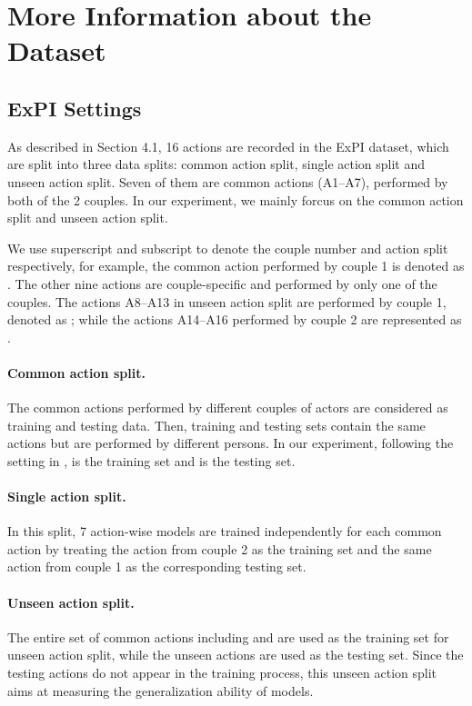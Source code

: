 \documentclass[10pt,twocolumn,letterpaper]{article}
\begin{document}
\section{More Information about the Dataset}
\label{app_sec:dataset}
\subsection{ExPI Settings}
As described in Section 4.1, 16 actions are recorded in the ExPI dataset, which are split into three data splits: common action split, single action split and unseen action split.
Seven of them are common actions (A1--A7), performed by both of the 2 couples. 
In our experiment, we mainly forcus on the common action split and unseen action split. 

We use superscript and subscript to denote the couple number and action split respectively, for example, the common action performed by couple 1 is denoted as .
The other nine actions are couple-specific and performed by only one of the couples.
The actions A8--A13 in unseen action split are performed by couple 1, denoted as ; while the actions A14--A16 performed by couple 2 are represented as . 

\paragraph{Common action split.}
The common actions performed by different couples of actors are considered as training and testing data.
Then, training and testing sets contain the same actions but are performed by different persons.
In our experiment, following the setting in \cite{guo2021multi},  is the training set and  is the testing set.

\paragraph{Single action split.}
In this split, 7 action-wise models are trained independently for each common action by treating the action from couple 2 as the training set and the same action from couple 1 as the corresponding testing set.

\paragraph{Unseen action split.}
The entire set of common actions including  and  are used as the training set for unseen action split, while the unseen actions  are used as the testing set.
Since the testing actions do not appear in the training process, this unseen action split aims at measuring the generalization ability of models.
\end{document}
